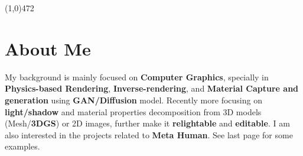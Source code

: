 \documentclass[margin,line]{resume}
\begin{document}
\begin{resume}


    



	\vspace{-5.0mm}
	\line(1,0){472}
	\vspace{-5.0mm}
	
	\section{\mysidestyle About Me}
	My background is mainly focused on \textbf{Computer Graphics}, specially in \textbf{Physics-based Rendering}, \textbf{Inverse-rendering}, and \textbf{Material Capture and generation} using \textbf{GAN/Diffusion} model. Recently more focusing on \textbf{light/shadow} and material properties decomposition from 3D models (Mesh/\textbf{3DGS}) or 2D images, further make it \textbf{relightable} and \textbf{editable}. I am also interested in the projects related to \textbf{Meta Human}. See last page for some examples.    


\end{resume}
\end{document}
